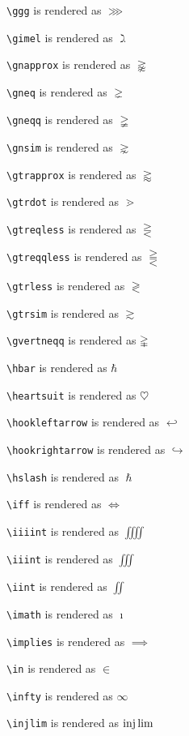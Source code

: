 \texttt{\textbackslash ggg} is rendered as $\ggg$

\texttt{\textbackslash gimel} is rendered as $\gimel$

\texttt{\textbackslash gnapprox} is rendered as $\gnapprox$

\texttt{\textbackslash gneq} is rendered as $\gneq$

\texttt{\textbackslash gneqq} is rendered as $\gneqq$

\texttt{\textbackslash gnsim} is rendered as $\gnsim$

\texttt{\textbackslash gtrapprox} is rendered as $\gtrapprox$

\texttt{\textbackslash gtrdot} is rendered as $\gtrdot$

\texttt{\textbackslash gtreqless} is rendered as $\gtreqless$

\texttt{\textbackslash gtreqqless} is rendered as $\gtreqqless$

\texttt{\textbackslash gtrless} is rendered as $\gtrless$

\texttt{\textbackslash gtrsim} is rendered as $\gtrsim$

\texttt{\textbackslash gvertneqq} is rendered as $\gvertneqq$

\texttt{\textbackslash hbar} is rendered as $\hbar$

\texttt{\textbackslash heartsuit} is rendered as $\heartsuit$

\texttt{\textbackslash hookleftarrow} is rendered as $\hookleftarrow$

\texttt{\textbackslash hookrightarrow} is rendered as $\hookrightarrow$

\texttt{\textbackslash hslash} is rendered as $\hslash$

\texttt{\textbackslash iff} is rendered as $\iff$

\texttt{\textbackslash iiiint} is rendered as $\iiiint$

\texttt{\textbackslash iiint} is rendered as $\iiint$

\texttt{\textbackslash iint} is rendered as $\iint$

\texttt{\textbackslash imath} is rendered as $\imath$

\texttt{\textbackslash implies} is rendered as $\implies$

\texttt{\textbackslash in} is rendered as $\in$

\texttt{\textbackslash infty} is rendered as $\infty$

\texttt{\textbackslash injlim} is rendered as $\injlim$

